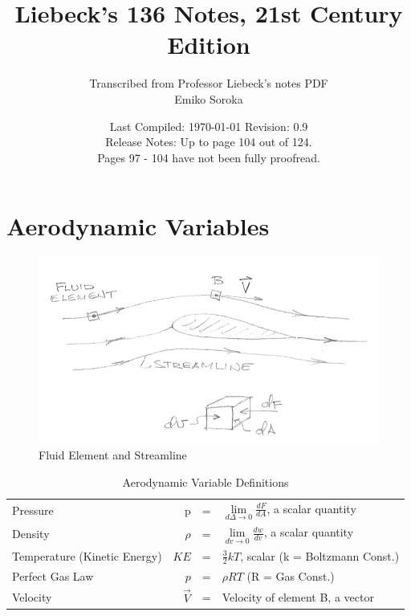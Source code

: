 \documentclass[draft=false, titlepage]{article}
\title{Liebeck's 136 Notes, 21st Century Edition}
\author{Transcribed from Professor Liebeck's notes PDF\\
\small Emiko Soroka}
\date{Last Compiled: \today\linebreak\linebreak
\small Revision: 0.9\\
Release Notes: Up to page 104 out of 124.\\Pages 97 - 104 have not been fully proofread.}
\begin{document}
\maketitle
\tableofcontents
\listoffigures
\listoftables
\pagebreak

\section{Aerodynamic Variables}
\begin{figure}[ht]
    \centering
    \includegraphics[width=0.7\linewidth]{Figures/pg1_1.png}
    \caption{Fluid Element and Streamline}
    \label{fig:pg1_1}
\end{figure}

\begin{table}[ht]
    \centering
    \renewcommand{\arraystretch}{1.5}
    \caption{Aerodynamic Variable Definitions}
    \begin{tabular}{l|rcl}
         Pressure & p &=& $\lim\limits_{d\Delta \to 0} \frac{dF}{dA}$, a scalar quantity\\
         Density & $\rho$ &=& $\lim\limits_{dv\to 0} \frac{dw}{dv}$, a scalar quantity\\
         Temperature (Kinetic Energy) & $KE$ &=& $\frac{3}{2}kT$, scalar (k = Boltzmann Const.)\\
         Perfect Gas Law & $p$ &=& $\rho RT$ (R = Gas Const.)\\
         Velocity & $\vec{V}$ &=& Velocity of element B, a vector\\
         
    \end{tabular}
    \label{tab:my_label}
\end{table}
\end{document}
